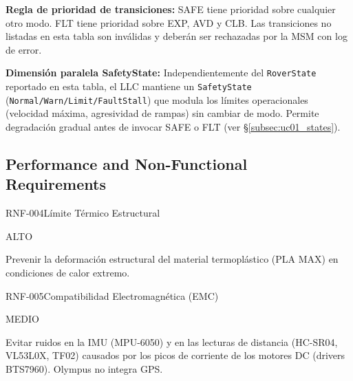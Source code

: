 \textbf{Regla de prioridad de transiciones:} SAFE tiene prioridad sobre cualquier otro modo. FLT tiene prioridad sobre EXP, AVD y CLB. Las transiciones no listadas en esta tabla son inválidas y deberán ser rechazadas por la MSM con log de error.

\textbf{Dimensión paralela SafetyState:} Independientemente del \texttt{RoverState} reportado en esta tabla, el LLC mantiene un \texttt{SafetyState} (\texttt{Normal/Warn/Limit/FaultStall}) que modula los límites operacionales (velocidad máxima, agresividad de rampas) sin cambiar de modo. Permite degradación gradual antes de invocar SAFE o FLT (ver \S\ref{subsec:uc01_states}).

\subsection{Performance and Non-Functional Requirements}

\begin{reqblock}{RNF-004}{Límite Térmico Estructural}
    \item[\textbf{Prioridad:}] ALTO
    \item[\textbf{Racional:}] Prevenir la deformación estructural del material termoplástico (PLA MAX) en condiciones de calor extremo.
\end{reqblock}

\begin{reqblock}{RNF-005}{Compatibilidad Electromagnética (EMC)}
    \item[\textbf{Prioridad:}] MEDIO
    \item[\textbf{Racional:}] Evitar ruidos en la IMU (MPU-6050) y en las lecturas de distancia (HC-SR04, VL53L0X, TF02) causados por los picos de corriente de los motores DC (drivers BTS7960). Olympus no integra GPS.
\end{reqblock}

